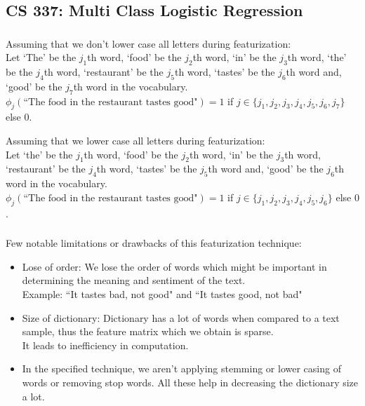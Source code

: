 \documentclass[12pt, fleqn]{article}
\begin{document}
\subsection{CS 337: Multi Class Logistic Regression}
\subsubsection{}
Assuming that we don't lower case all letters during featurization: \\
Let `The' be the $j_1$th word, `food' be the $j_2$th word, `in' be the $j_3$th word, `the' be the $j_4$th word, `restaurant' be the $j_5$th word, `tastes' be the $j_6$th word and, `good' be the $j_7$th word in the vocabulary. \\
$\phi_j(\text{``The food in the restaurant tastes good"}) = 1$ if $j \in \{j_1, j_2, j_3, j_4, j_5, j_6, j_7 \}$ else $0$.

\medskip

Assuming that we lower case all letters during featurization: \\
Let `the' be the $j_1$th word, `food' be the $j_2$th word, `in' be the $j_3$th word, `restaurant' be the $j_4$th word, `tastes' be the $j_5$th word and, `good' be the $j_6$th word in the vocabulary. \\
$\phi_j(\text{``The food in the restaurant tastes good"}) = 1$ if $j \in \{j_1, j_2, j_3, j_4, j_5, j_6 \}$ else $0$.

\subsubsection{}
Few notable limitations or drawbacks of this featurization technique:
\begin{itemize}
  \item Lose of order: We lose the order of words which might be important in determining the meaning and sentiment of the text. \\
        Example: ``It tastes bad, not good" and ``It tastes good, not bad"

  \item Size of dictionary: Dictionary has a lot of words when compared to a text sample, thus the feature matrix which we obtain is sparse. \\
        It leads to inefficiency in computation.

  \item In the specified technique, we aren't applying stemming or lower casing of words or removing stop words. All these help in decreasing the dictionary size a lot.
\end{itemize}
\end{document}
